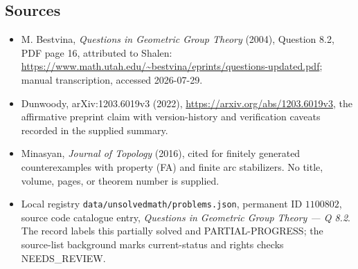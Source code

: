 \documentclass[11pt]{article}
\begin{document}
\subsection{Sources}
\begin{itemize}
\item M. Bestvina, \emph{Questions in Geometric Group Theory} (2004), Question 8.2, PDF page 16, attributed to Shalen: \url{https://www.math.utah.edu/~bestvina/eprints/questions-updated.pdf}; manual transcription, accessed 2026-07-29.
\item Dunwoody, arXiv:1203.6019v3 (2022), \url{https://arxiv.org/abs/1203.6019v3}, the affirmative preprint claim with version-history and verification caveats recorded in the supplied summary.
\item Minasyan, \emph{Journal of Topology} (2016), cited for finitely generated counterexamples with property (FA) and finite arc stabilizers. No title, volume, pages, or theorem number is supplied.
\item Local registry \texttt{data/unsolvedmath/problems.json}, permanent ID $1100802$, source code catalogue entry, \emph{Questions in Geometric Group Theory --- Q 8.2}. The record labels this partially solved and PARTIAL-PROGRESS; the source-list background marks current-status and rights checks NEEDS\_REVIEW.
\end{itemize}
\end{document}
